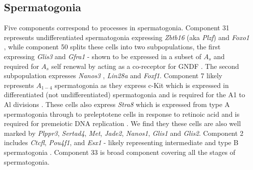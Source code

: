 \subsection{Spermatogonia}


Five components correspond to processes in spermatogonia.
Component 31 represents undifferentiated spermatogonia expressing \textit{Zbtb16} (aka \textit{Plzf}) \parencite{Buaas2004Plzf} and \textit{Foxo1} \parencite{Goertz2011Foxo1}, while component 50 splits these cells into two subpopulations, the first expressing \textit{Glis3} \parencite{Kang2016Transcription} and \textit{Gfra1} - shown to be expressed in a subset of $A_s$ and required for $A_s$ self renewal by acting as a co-receptor for GNDF \parencite{Meng2000Regulation,He2007Gfra1}.
The second subpopulation expresses \textit{Nanos3} \parencite{Suzuki2009heterogeneity}, \textit{Lin28a} \parencite{Zheng2009pluripotency} and \textit{Foxf1}.
Component 7 likely represents $A_{1-4}$ spermatogonia as they express c-Kit which is expressed in differentiated (not undifferentiated) spermatogonia \parencite{Manova1990Gonadal,Schrans-Stassen1999Differential} and is required for the A1 to Al divisions \parencite{Yoshinaga1991Role}.
These cells also express \textit{Stra8} which is expressed from type A spermatogonia through to preleptotene cells in response to retinoic acid \parencite{Oulad-Abdelghani1996Characterization,Zhou2008Expression,Endo2015Periodic} and is required for premeiotic DNA replication \parencite{Baltus2006germ}.
We find they these cells are also well marked by \textit{Plppr3}, \textit{Sertad4}, \textit{Met}, \textit{Jade2}, \textit{Nanos1}, \textit{Glis1} and \textit{Glis2}.
Component 2 includes \textit{Ctcfl}, \textit{Pou4f1}, and \textit{Esx1} - likely representing intermediate and type B spermatogonia \parencite{Sleutels2012male, Budhram-Mahadeo2001closely, Maezawa2018Dynamic, Li1997Esx1, Branford1997Spx1}.
Component 33 is broad component covering all the stages of spermatogonia.


